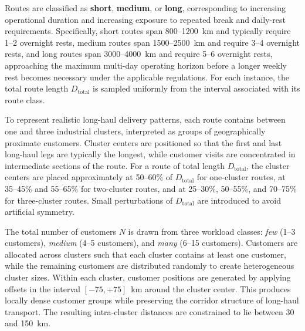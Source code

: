 \documentclass[3p,11pt,authoryear]{elsarticle}  %
\begin{document}
Routes are classified as \textbf{short}, \textbf{medium}, or \textbf{long}, corresponding to increasing operational duration and increasing exposure to repeated break and daily-rest requirements. Specifically, short routes span 800--1200~km and typically require 1--2 overnight rests, medium routes span 1500--2500~km and require 3--4 overnight rests, and long routes span 3000--4000~km and require 5--6 overnight rests, approaching the maximum multi-day operating horizon before a longer weekly rest becomes necessary under the applicable regulations. For each instance, the total route length \(D_{\text{total}}\) is sampled uniformly from the interval associated with its route class.

To represent realistic long-haul delivery patterns, each route contains between one and three industrial clusters, interpreted as groups of geographically proximate customers. Cluster centers are positioned so that the first and last long-haul legs are typically the longest, while customer visits are concentrated in intermediate sections of the route. For a route of total length \(D_{\text{total}}\), the cluster centers are placed approximately at 50--60\% of \(D_{\text{total}}\) for one-cluster routes, at 35--45\% and 55--65\% for two-cluster routes, and at 25--30\%, 50--55\%, and 70--75\% for three-cluster routes. Small perturbations of \(D_{\text{total}}\) are introduced to avoid artificial symmetry.

The total number of customers \(N\) is drawn from three workload classes: \emph{few} (1--3 customers), \emph{medium} (4--5 customers), and \emph{many} (6--15 customers). Customers are allocated across clusters such that each cluster contains at least one customer, while the remaining customers are distributed randomly to create heterogeneous cluster sizes. Within each cluster, customer positions are generated by applying offsets in the interval \([-75,+75]\)~km around the cluster center. This produces locally dense customer groups while preserving the corridor structure of long-haul transport. The resulting intra-cluster distances are constrained to lie between 30 and 150~km.
\end{document}

